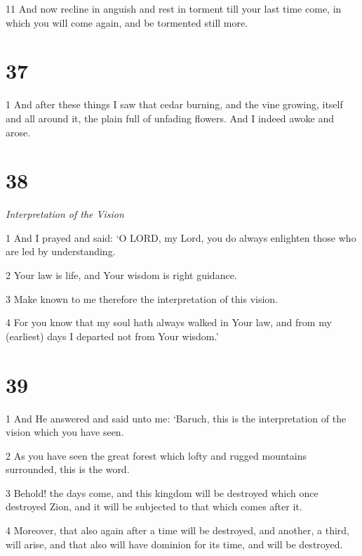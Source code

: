 \par 11 And now recline in anguish and rest in torment till your last time come, in which you will come again, and be tormented still more.

\chapter{37}

\par 1 And after these things I saw that cedar burning, and the vine growing, itself and all around it, the plain full of unfading flowers. And I indeed awoke and arose.

\chapter{38}

\par \textit{Interpretation of the Vision}

\par 1 And I prayed and said: ‘O LORD, my Lord, you do always enlighten those who are led by understanding. 

\par 2 Your law is life, and Your wisdom is right guidance. 

\par 3 Make known to me therefore the interpretation of this vision. 

\par 4 For you know that my soul hath always walked in Your law, and from my (earliest) days I departed not from Your wisdom.’

\chapter{39}

\par 1 And He answered and said unto me: ‘Baruch, this is the interpretation of the vision which you have seen. 

\par 2 As you have seen the great forest which lofty and rugged mountains surrounded, this is the word. 

\par 3 Behold! the days come, and this kingdom will be destroyed which once destroyed Zion, and it will be subjected to that which comes after it. 

\par 4 Moreover, that also again after a time will be destroyed, and another, a third, will arise, and that also will have dominion for its time, and will be destroyed. 

